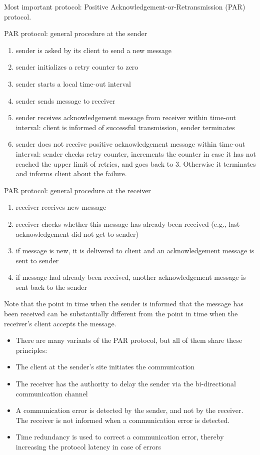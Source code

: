 Most important protocol: Positive Acknowledgement-or-Retransmission
(PAR) protocol.

PAR protocol: general procedure at the sender

\begin{enumerate}
\def\labelenumi{\arabic{enumi}.}
\item
  sender is asked by its client to send a new message
\item
  sender initializes a retry counter to zero
\item
  sender starts a local time-out interval
\item
  sender sends message to receiver
\item
  sender receives acknowledgement message from receiver within time-out
  interval: client is informed of successful transmission, sender
  terminates
\item
  sender does not receive positive acknowledgement message within
  time-out interval: sender checks retry counter, increments the counter
  in case it has not reached the upper limit of retries, and goes back
  to 3. Otherwise it terminates and informs client about the failure.
\end{enumerate}

PAR protocol: general procedure at the receiver

\begin{enumerate}
\def\labelenumi{\arabic{enumi}.}
\item
  receiver receives new message
\item
  receiver checks whether this message has already been received (e.g.,
  last acknowledgement did not get to sender)
\item
  if message is new, it is delivered to client and an acknowledgement
  message is sent to sender
\item
  if message had already been received, another acknowledgement message
  is sent back to the sender
\end{enumerate}

Note that the point in time when the sender is informed that the message
has been received can be substantially different from the point in time
when the receiver's client accepts the message.

\begin{itemize}
\item
  There are many variants of the PAR protocol, but all of them share
  these principles:
\item
  The client at the sender's site initiates the communication
\item
  The receiver has the authority to delay the sender via the
  bi-directional communication channel
\item
  A communication error is detected by the sender, and not by the
  receiver. The receiver is not informed when a communication error is
  detected.
\item
  Time redundancy is used to correct a communication error, thereby
  increasing the protocol latency in case of errors
\end{itemize}

